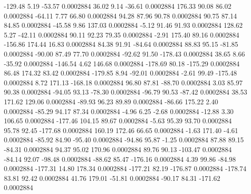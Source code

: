      -129.48        5.19      -53.57     0.0002884
       36.02        9.14      -36.61     0.0002884
      176.33       90.08       86.02     0.0002884
      -64.11        7.77       66.80     0.0002884
       94.28       87.96       90.78     0.0002884
       90.75       87.14       84.85     0.0002884
      -45.58        9.86      137.03     0.0002884
       -5.12       91.46       91.93     0.0002884
      128.62        5.27      -42.11     0.0002884
       90.11       92.23       79.35     0.0002884
       -2.91      175.40       89.16     0.0002884
     -156.86      174.44       16.83     0.0002884
       84.38       91.91      -84.64     0.0002884
       88.83       95.15      -81.85     0.0002884
      -90.00       87.49       77.70     0.0002884
      -92.62       91.50     -178.43     0.0002884
       38.65        8.66      -35.92     0.0002884
     -146.54        4.62      146.68     0.0002884
     -178.69       80.18     -175.29     0.0002884
       86.48      174.32       83.42     0.0002884
     -179.85        8.94      -92.01     0.0002884
       -2.61       99.49     -175.48     0.0002884
        8.72      171.13     -168.18     0.0002884
       96.80       87.81      -88.70     0.0002884
        3.03       85.97       90.38     0.0002884
      -94.05       93.13      -78.30     0.0002884
      -96.79       90.53      -87.42     0.0002884
       38.53      171.62      129.06     0.0002884
      -89.93       96.23       89.89     0.0002884
      -86.66      175.22        2.40     0.0002884
      -85.29       94.17       87.34     0.0002884
       -4.96        6.25       -2.68     0.0002884
      -12.88        3.30      106.65     0.0002884
     -177.46      104.15       89.67     0.0002884
       -5.63       95.39       93.70     0.0002884
       95.78       92.45     -177.68     0.0002884
      160.19      172.46       66.65     0.0002884
       -1.63      171.40       -4.61     0.0002884
      -85.92       84.90      -95.40     0.0002884
      -94.86       95.87       -1.25     0.0002884
       87.88       89.15      -84.31     0.0002884
       94.37       95.02      170.96     0.0002884
       89.76       90.13     -103.47     0.0002884
      -84.14       92.07      -98.48     0.0002884
      -88.62       85.47     -176.16     0.0002884
        4.39       99.86      -84.98     0.0002884
     -177.31       14.80      178.34     0.0002884
     -177.21       82.19     -176.87     0.0002884
     -178.74       83.81       92.42     0.0002884
       41.76      179.01      -51.81     0.0002884
      -90.17       84.31     -171.62     0.0002884
